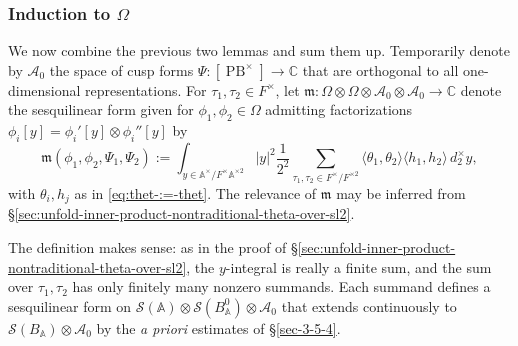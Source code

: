\documentclass[reqno,10pt]{amsart}
\theoremstyle{plain} %
\theoremstyle{definition}
\theoremstyle{plain} %
\theoremstyle{remark}
\theoremstyle{itplain} %
\theoremstyle{remark} %
\numberwithin{equation}{section}
\def\PB{\operatorname{PB}}
\begin{document}
\subsubsection{Induction to $\Omega$}\label{sec:induction-omega}
We now combine the previous two lemmas and sum them up.
Temporarily denote by $\mathcal{A}_0$ the space of cusp forms $\Psi : [\PB^\times] \rightarrow \mathbb{C}$ that are orthogonal to all one-dimensional representations.  For $\tau_1, \tau_2 \in F^\times$, let $\mathfrak{m} : \Omega \otimes \Omega \otimes \mathcal{A}_0 \otimes \mathcal{A}_0 \rightarrow \mathbb{C}$ denote the sesquilinear form given for $\phi_1, \phi_2 \in \Omega$ admitting factorizations $\phi_i[y] = \phi_i'[y] \otimes \phi_i''[y]$ by
\begin{equation}
  \mathfrak{m}(\phi_1,\phi_2,\Psi_1,\Psi_2)
  :=
  \int_{y \in \mathbb{A}^\times / F^{\times }
    \mathbb{A}^{\times 2}}
  |y|^2
  \frac{1}{2^2}
  \sum_{\tau_1,\tau_2 \in F^\times / F^{\times 2}}
  \langle \theta_1, \theta_2 \rangle
  \langle h_1, h_2 \rangle \, d_2^\times y,
\end{equation}
with $\theta_i, h_j$ as in \eqref{eq:thet-:=-thet}.  The relevance of $\mathfrak{m}$ may be inferred from \S\ref{sec:unfold-inner-product-nontraditional-theta-over-sl2}.

The definition makes sense: as in the proof of \S\ref{sec:unfold-inner-product-nontraditional-theta-over-sl2}, the $y$-integral is really a finite sum, and the sum over $\tau_1, \tau_2$ has only finitely many nonzero summands.  Each summand defines a sesquilinear form on $\mathcal{S}(\mathbb{A}) \otimes \mathcal{S}(B_\mathbb{A}^0) \otimes \mathcal{A}_0$ that extends continuously to $\mathcal{S}(B_\mathbb{A}) \otimes \mathcal{A}_0$ by the \emph{a priori} estimates of \S\ref{sec-3-5-4}.
\end{document}
